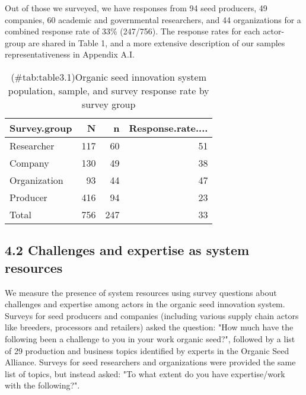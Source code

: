 \documentclass[twoside,12pt,final]{ucthesis-CA2012}
\begin{document}
\begin{ucmainmatter}
Out of those we surveyed, we have responses from 94 seed producers, 49
companies, 60 academic and governmental researchers, and 44
organizations for a combined response rate of 33\% (247/756). The
response rates for each actor-group are shared in Table 1, and a more
extensive description of our sample\textquotesingle s representativeness in Appendix
A.I.
\begin{table}

\caption{(\#tab:table3.1)Organic seed innovation system population, sample, and survey response rate by survey group}
\centering
\begin{tabular}[t]{lrrr}
\toprule
Survey.group & N & n & Response.rate....\\
\midrule
Researcher & 117 & 60 & 51\\
Company & 130 & 49 & 38\\
Organization & 93 & 44 & 47\\
Producer & 416 & 94 & 23\\
Total & 756 & 247 & 33\\
\bottomrule
\end{tabular}
\end{table}
\hypertarget{challenges-and-expertise-as-system-resources}{%
\subsection{4.2 Challenges and expertise as system resources}\label{challenges-and-expertise-as-system-resources}}

We measure the presence of system resources using survey questions about
challenges and expertise among actors in the organic seed innovation
system. Surveys for seed producers and companies (including various
supply chain actors like breeders, processors and retailers) asked the
question: "How much have the following been a challenge to you in your
work organic seed?", followed by a list of 29 production and business
topics identified by experts in the Organic Seed Alliance. Surveys for
seed researchers and organizations were provided the same list of
topics, but instead asked: "To what extent do you have expertise/work
with the following?".


\end{ucmainmatter}
\end{document}
